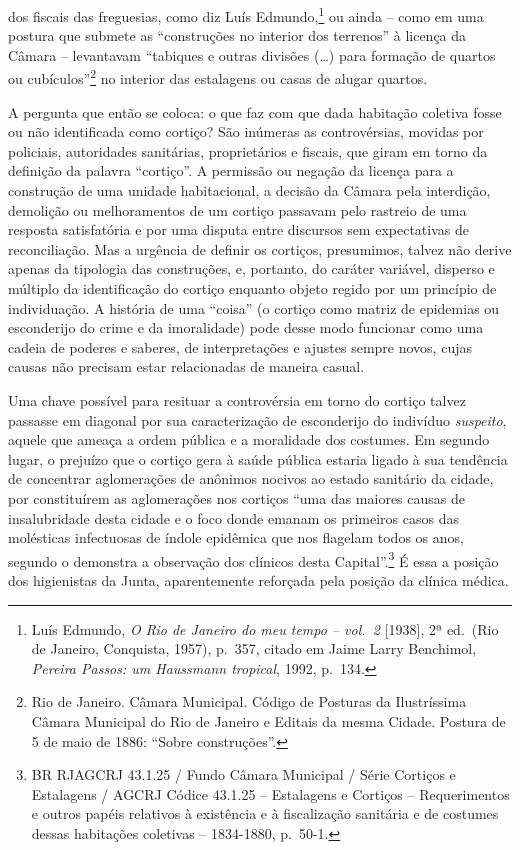dos fiscais das freguesias, como diz Luís Edmundo,\footnote{Luís
  Edmundo, \emph{O Rio de Janeiro do meu tempo -- vol.~2} {[}1938{]}, 2ª
  ed.~(Rio de Janeiro, Conquista, 1957), p.~357, citado em Jaime Larry
  Benchimol, \emph{Pereira Passos: um Haussmann tropical}, 1992, p.~134.}
ou ainda -- como em uma postura que submete as ``construções no interior
dos terrenos'' à licença da Câmara -- levantavam ``tabiques e outras
divisões (\ldots{}) para formação de quartos ou cubículos''\footnote{Rio
  de Janeiro. Câmara Municipal. Código de Posturas da Ilustríssima
  Câmara Municipal do Rio de Janeiro e Editais da mesma Cidade. Postura
  de 5 de maio de 1886: ``Sobre construções''.} no interior das
estalagens ou casas de alugar quartos.

A pergunta que então se coloca: o que faz com que dada habitação
coletiva fosse ou não identificada como cortiço? São inúmeras as
controvérsias, movidas por policiais, autoridades sanitárias,
proprietários e fiscais, que giram em torno da definição da palavra
``cortiço''. A permissão ou negação da licença para a construção de uma
unidade habitacional, a decisão da Câmara pela interdição, demolição ou
melhoramentos de um cortiço passavam pelo rastreio de uma resposta
satisfatória e por uma disputa entre discursos sem expectativas de
reconciliação. Mas a urgência de definir os cortiços, presumimos, talvez
não derive apenas da tipologia das construções, e, portanto, do caráter
variável, disperso e múltiplo da identificação do cortiço enquanto
objeto regido por um princípio de individuação. A história de uma
``coisa'' (o cortiço como matriz de epidemias ou esconderijo do crime e
da imoralidade) pode desse modo funcionar como uma cadeia de poderes e
saberes, de interpretações e ajustes sempre novos, cujas causas não
precisam estar relacionadas de maneira casual.

Uma chave possível para resituar a controvérsia em torno do cortiço
talvez passasse em diagonal por sua caracterização de esconderijo do
indivíduo \emph{suspeito}, aquele que ameaça a ordem pública e a
moralidade dos costumes. Em segundo lugar, o prejuízo que o cortiço gera
à saúde pública estaria ligado à sua tendência de concentrar
aglomerações de anônimos nocivos ao estado sanitário da cidade, por
constituírem as aglomerações nos cortiços ``uma das maiores causas de
insalubridade desta cidade e o foco donde emanam os primeiros casos das
molésticas infectuosas de índole epidêmica que nos flagelam todos os
anos, segundo o demonstra a observação dos clínicos desta
Capital''.\footnote{BR RJAGCRJ 43.1.25 / Fundo Câmara Municipal / Série
  Cortiços e Estalagens / AGCRJ Códice 43.1.25 -- Estalagens e Cortiços
  -- Requerimentos e outros papéis relativos à existência e à
  fiscalização sanitária e de costumes dessas habitações coletivas --
  1834-1880, p.~50-1.} É essa a posição dos higienistas da Junta,
aparentemente reforçada pela posição da clínica médica.

